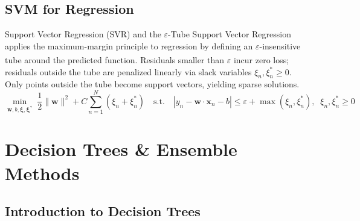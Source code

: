 \subsection{SVM for Regression}

\begin{v3topic}{Support Vector Regression (SVR) and the $\varepsilon$-Tube}
    Support Vector Regression applies the maximum-margin principle to regression by defining an $\varepsilon$-insensitive tube around the predicted function\textsuperscript{\cite[][pp.~98--101]{iiiCourseMachineLearning}}. Residuals smaller than $\varepsilon$ incur zero loss; residuals outside the tube are penalized linearly via slack variables $\xi_n, \xi_n^* \geq 0$. Only points outside the tube become support vectors, yielding sparse solutions.
\visualseparator
    \begin{equation}
        \min_{\mathbf{w},b,\boldsymbol{\xi},\boldsymbol{\xi}^*}\; \frac{1}{2}\|\mathbf{w}\|^2 + C\sum_{n=1}^{N}(\xi_n + \xi_n^*)
        \quad\text{s.t.}\quad
        \left|y_n - \mathbf{w}\cdot\mathbf{x}_n - b\right| \leq \varepsilon + \max(\xi_n, \xi_n^*),\;\; \xi_n,\xi_n^* \geq 0
    \end{equation}
\end{v3topic}

\section{Decision Trees \& Ensemble Methods}

\subsection{Introduction to Decision Trees}

